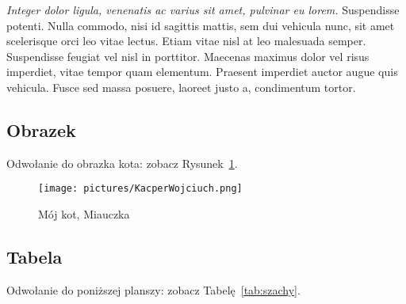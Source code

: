 \textit{Integer dolor ligula, venenatis ac varius sit amet, pulvinar eu lorem.} Suspendisse potenti. Nulla commodo, nisi id sagittis mattis, sem dui vehicula nunc, sit amet scelerisque orci leo vitae lectus. Etiam vitae nisl at leo malesuada semper. Suspendisse feugiat vel nisl in porttitor. Maecenas maximus dolor vel risus imperdiet, vitae tempor quam elementum. Praesent imperdiet auctor augue quis vehicula. Fusce sed massa posuere, laoreet justo a, condimentum tortor.

\subsection{Obrazek}
Odwołanie do obrazka kota: zobacz Rysunek~\ref{fig:miauczka}.
\begin{figure}[htbp]
    \centering
    \texttt{[image: pictures/KacperWojciuch.png]}
    \caption{Mój kot, Miauczka}
    \label{fig:miauczka}
\end{figure}

\subsection{Tabela}
Odwołanie do poniższej planszy: zobacz Tabelę~\ref{tab:szachy}.

